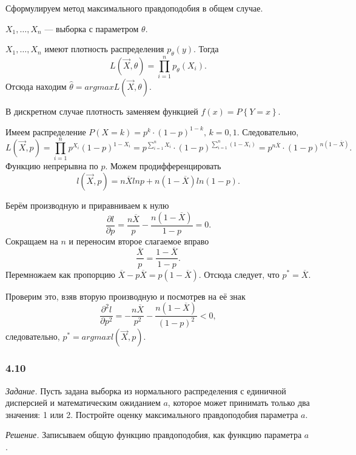 Сформулируем метод максимального правдоподобия в общем случае.

$X_1, \dotsc, X_n$ --- выборка с параметром $ \theta $.

$X_1, \dotsc, X_n$ имеют плотность распределения $p_{ \theta } \left( y \right) $.
Тогда
$$L \left( \vec{X}, \theta \right) =
  \prod \limits_{i = 1}^n p_{ \theta } \left( X_i \right).$$
Отсюда находим $ \hat{ \theta } = argmax L \left( \vec{X}, \theta \right)$.

В дискретном случае плотность заменяем функцией $f \left( x \right) = P \left\{ Y = x \right\} $.

Имеем распределение $P \left( X = k \right) = p^k \cdot \left( 1 - p \right)^{1 - k}, \, k = 0, 1$.
Следовательно,
$$L \left( \vec{X}, p \right) =
  \prod \limits_{i = 1}^n p^{X_i} \left( 1 - p \right)^{1 - X_i} =
  p^{ \sum \limits_{i = 1}^n X_i} \cdot
  \left( 1 - p \right)^{ \sum \limits_{i = 1}^n \left( 1 - X_i \right) }=
  p^{n \overline{X}} \cdot \left( 1 - p \right)^{n \left( 1 - \overline{X} \right) }.$$
Функцию непрерывна по $p$.
Можем продифференцировать
$$l \left( \vec{X}, p \right) =
  n \overline{X} ln p + n \left( 1 - \overline{X} \right) ln \left( 1 - p \right).$$

Берём производную и приравниваем к нулю
$$ \frac{ \partial l}{ \partial p} =
  \frac{n \overline{X}}{p} - \frac{n \left( 1 - \overline{X} \right) }{1 - p} = 0.$$
Сокращаем на $n$ и переносим второе слагаемое вправо
$$ \frac{ \overline{X}}{p} =
  \frac{1 - \overline{X}}{1 - p}.$$
Перемножаем как пропорцию $ \overline{X} - p \overline{X} = p \left( 1 - \overline{X} \right) $.
Отсюда следует, что $p^* = \overline{X}$.

Проверим это, взяв вторую производную и посмотрев на её знак
$$ \frac{ \partial^2 l}{ \partial p^2} =
  - \frac{n \overline{X}}{p^2} -
  \frac{n \left( 1 - \overline{X} \right) }{ \left( 1 - p \right)^2} <
  0,$$
следовательно, $p^* = argmax l \left( \vec{X}, p \right) $.

\subsubsection*{4.10}

\textit{Задание.}
Пусть задана выборка из нормального распределения с единичной
дисперсией и математическим ожиданием $a$, которое может принимать только два значения: 1 или 2.
Постройте оценку максимального правдоподобия параметра $a$.

\textit{Решение.} Записываем общую функцию правдоподобия, как функцию параметра $a$.

